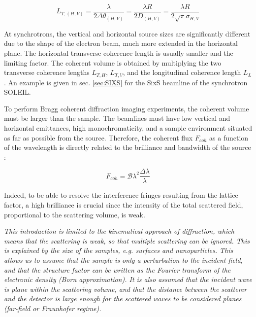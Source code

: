 \begin{equation}
    \label{eq:TransverseCoL}
    L_{T,(H, V)} = \frac{\lambda}{2\Delta\theta_{(H, V)}} = \frac{\lambda R}{2 D_{(H, V)}} = \frac{\lambda R}{2\sqrt{\pi}\sigma_{H, V}}
\end{equation}

At synchrotrons, the vertical and horizontal source sizes are significantly different due to the shape of the electron beam, much more extended in the horizontal plane.
The horizontal transverse coherence length is usually smaller and the limiting factor.
The coherent volume is obtained by multiplying the two transverse coherence lengths $L_{T,H}$, $L_{T,V}$, and the longitudinal coherence length $L_L$.
An example is given in sec. \ref{sec:SIXS} for the SixS beamline of the synchrotron SOLEIL.

To perform Bragg coherent diffraction imaging experiments, the coherent volume must be larger than the sample.
The beamlines must have low vertical and horizontal emittances, high monochromaticity, and a sample environment situated as far as possible from the source.
Therefore, the coherent flux $F_{coh}$ as a function of the wavelength is directly related to the brilliance and bandwidth of the source \parencite{Willmott}:

\begin{equation}
    \label{eq:CoherentFlux}
    F_{coh} = \mathcal{B} \lambda^2 \frac{\Delta \lambda}{\lambda}
\end{equation}

Indeed, to be able to resolve the interference fringes resulting from the lattice factor, a high brilliance is crucial since the intensity of the total scattered field, proportional to the scattering volume, is weak.

\textit{
This introduction is limited to the kinematical approach of diffraction, which means that the scattering is weak, so that multiple scattering can be ignored.
This is explained by the size of the samples, e.g. surfaces and nanoparticles.
This allows us to assume that the sample is only a perturbation to the incident field, and that the structure factor can be written as the Fourier transform of the electronic density (Born approximation).
It is also assumed that the incident wave is plane within the scattering volume, and that the distance between the scatterer and the detector is large enough for the scattered waves to be considered planes (far-field or Fraunhofer regime).
}
